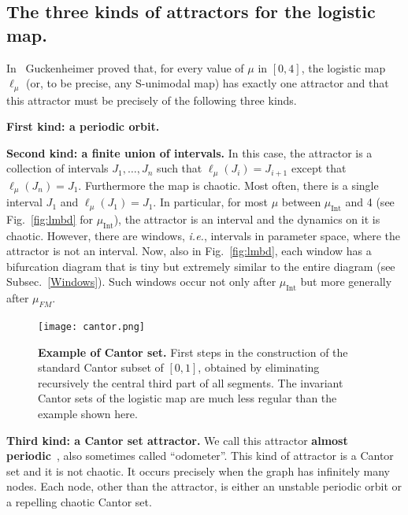 \documentclass{article}
\def\INT{_\text{Int}}
\newcommand{\allviolet}{\color{violet}{}}
\newcommand{\ie}{{\it{i.e.}}}
\begin{document}
\subsection{The three kinds of attractors for the logistic map.}

In~\cite{Guc79} Guckenheimer proved that, for every value of $\mu$ in $[0,4]$, the logistic map $\ell_\mu$ (or, to be precise, any S-unimodal map) has exactly one attractor and that this attractor must be precisely of the following three kinds. 

{\bf First kind: a periodic orbit.} 

{\bf Second kind: a finite union of intervals.} 
In this case, the attractor is a collection of intervals $J_1,\dots,J_n$ such that $\ell_\mu(J_i)=J_{i+1}$ except that $\ell_\mu(J_n)=J_{1}$. Furthermore the map is chaotic. 
Most often, there is a single interval $J_1$ and $\ell_\mu(J_1)=J_{1}$.
In particular, for most $\mu$ between $\mu\INT$ and 4 (see Fig.~\ref{fig:lmbd} for $\mu\INT$), the attractor is an interval and the dynamics on it is chaotic. 
However, there are windows, \ie, intervals in parameter space, where the attractor is not an interval.
Now, also in Fig.~\ref{fig:lmbd}, each window has a bifurcation diagram that is tiny but extremely similar to the entire diagram (see Subsec.~\ref{Windows}). Such windows occur not only after $\mu\INT$ but more generally after $\mu_{FM}$. 


%
\begin{figure}
 \centering
 \texttt{[image: cantor.png]}\ \caption{{\bf Example of Cantor set.} First steps in the construction of the standard Cantor subset of $[0,1]$, obtained by eliminating recursively the central third part of all segments. 
 The invariant Cantor sets of the logistic map are much less regular than the example shown here. 
 }
 \label{fig:cantor}
 \end{figure}


{\bf Third kind: a Cantor set attractor.}
We call this attractor {\bf almost periodic}~\cite{Mil85}, also sometimes called ``odometer''. This kind of attractor is a Cantor set and it is not chaotic.
It occurs precisely when the graph  has infinitely many nodes. 
Each node, other than the attractor, is either an unstable periodic orbit or a repelling chaotic Cantor set.
\end{document}
